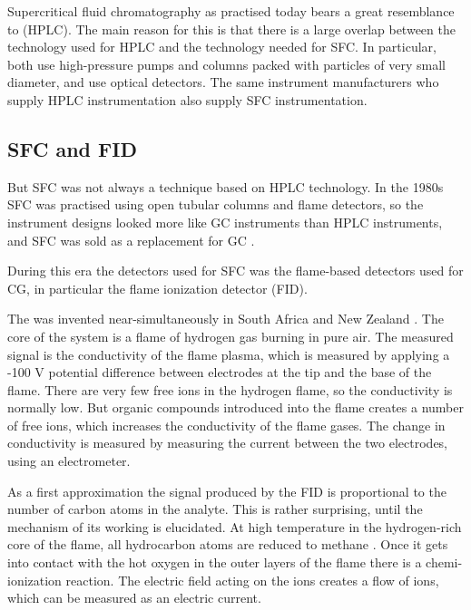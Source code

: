 Supercritical fluid chromatography as practised today bears a great resemblance
to  (HPLC). The main reason for
this is that there is a large overlap between the technology used for HPLC and
the technology needed for SFC. In particular, both use high-pressure pumps and
columns packed with particles of very small diameter, and use optical
detectors. The same instrument manufacturers who supply HPLC instrumentation
also supply SFC instrumentation.

\subsection{SFC and FID}

But SFC was not always a technique based on HPLC technology. In the 1980s SFC
was practised using open tubular columns and flame detectors, so the instrument
designs looked more like GC instruments than HPLC instruments, and SFC was sold
as a replacement for GC \autocite{Poole2003}.

During this era the detectors used for SFC was the flame-based detectors used
for CG, in particular the flame ionization detector (FID).

The  was invented near-simultaneously in South
Africa and New Zealand \autocite{Ettre2008}. The core of the system is a
flame of hydrogen gas burning in pure air. The measured signal is the conductivity of
the flame plasma, which is measured by applying a {-100} V potential difference
between electrodes at the tip and the base of the flame. There are very few free
ions in the hydrogen flame, so the conductivity is normally low. But organic
compounds introduced into the flame creates a number of free ions, which
increases the conductivity of the flame gases. The change in conductivity is
measured by measuring the current between the two electrodes, using an electrometer. 

As a first approximation the signal produced by the FID is proportional to the
number of carbon atoms in the analyte. This is rather surprising, until the
mechanism of its working is elucidated. At high temperature in the hydrogen-rich
core of the flame, all hydrocarbon atoms are reduced to methane
\autocite{Holm1996}. Once it gets into contact with the hot oxygen in the outer
layers of the flame there is a chemi-ionization reaction. The electric field
acting on the ions creates a flow of ions, which can be measured as an electric
current.

